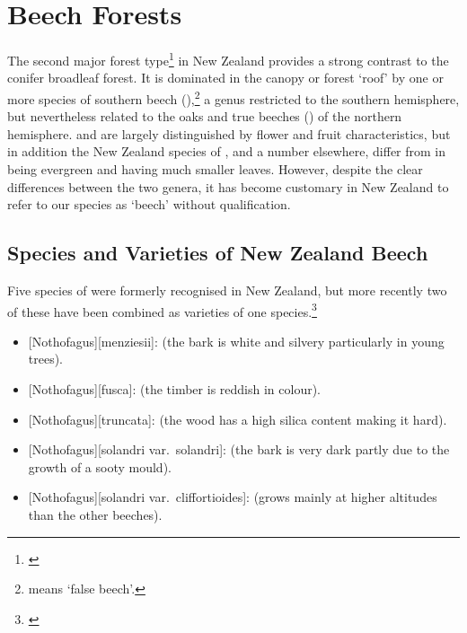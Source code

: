 \chapter{Beech Forests}%
\label{ch:beechforests}

The second major forest type\footnote{\cite{wardle1984beeches}} in New Zealand provides a strong contrast to the conifer broadleaf forest.
It is dominated in the canopy or forest `roof' by one or more species of southern beech (),\footnote{ means `false beech'.} a genus restricted to the southern hemisphere, but nevertheless related to the oaks and true beeches () of the northern hemisphere.
 and  are largely distinguished by flower and fruit characteristics, but in addition the New Zealand species of , and a number elsewhere, differ from  in being evergreen and having much smaller leaves.
However, despite the clear differences between the two genera, it has become customary in New Zealand to refer to our species as `beech' without qualification.

\section{Species and Varieties of New Zealand Beech}

Five species of  were formerly recognised in New Zealand, but more recently two of these have been combined as varieties of one species.\footnote{\cite{poole1958studies}}

\begin{itemize}
	\item {}[Nothofagus][menziesii]:  (the bark is white and silvery particularly in young trees).
	\item {}[Nothofagus][fusca]:  (the timber is reddish in colour).
	\item {}[Nothofagus][truncata]:  (the wood has a high silica content making it hard).
	\item {}[Nothofagus][solandri var.\ solandri]:  (the bark is very dark partly due to the growth of a sooty mould).
	\item {}[Nothofagus][solandri var.\ cliffortioides]:  (grows mainly at higher altitudes than the other beeches).
\end{itemize}

